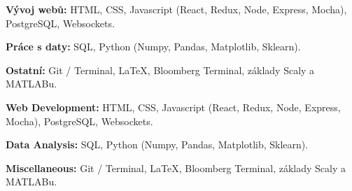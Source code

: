 \ifczech

\textbf{Vývoj webů:} HTML, CSS, Javascript (React, Redux, Node, Express, Mocha), PostgreSQL, Websockets. \par
\textbf{Práce s daty:} SQL, Python (Numpy, Pandas, Matplotlib, Sklearn). \par
\textbf{Ostatní:} Git / Terminal, LaTeX, Bloomberg Terminal, základy Scaly a MATLABu. \par

\else

\textbf{Web Development:} HTML, CSS, Javascript (React, Redux, Node, Express, Mocha), PostgreSQL, Websockets. \par
\textbf{Data Analysis:} SQL, Python (Numpy, Pandas, Matplotlib, Sklearn). \par
\textbf{Miscellaneous:} Git / Terminal, LaTeX, Bloomberg Terminal, základy Scaly a MATLABu. \par

\fi